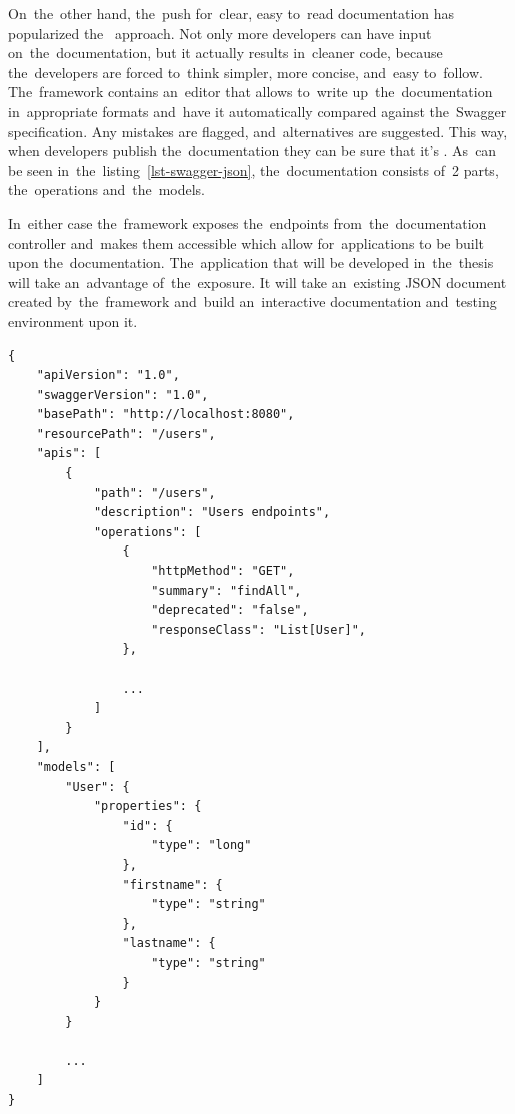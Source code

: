On~the~other hand, the~push for~clear, easy to~read documentation has
popularized the~ approach. Not only more developers can have
input on~the~documentation, but it actually results in~cleaner code, because
the~developers are forced to~think simpler, more concise, and~easy to~follow.
The~framework contains an~editor that allows to~write up~the~documentation
in~appropriate formats and~have it automatically compared against the~Swagger
specification. Any mistakes are flagged, and~alternatives are suggested. This
way, when developers publish the~documentation they can be sure that it's
. As~can be seen in~the~listing~\ref{lst-swagger-json},
the~documentation consists of~2 parts, the~operations and~the~models.

In~either case the~framework exposes the~endpoints from~the~documentation
controller and~makes them accessible which allow for~applications to be built
upon the~documentation. The~application that will be developed in~the~thesis
will take an~advantage of~the~exposure. It will take an~existing JSON document
created by~the~framework and~build an~interactive documentation and~testing
environment upon it.

\vspace{1mm}
\begin{lstlisting}[caption=An~example of~API documentation in~JSON format
created using the~Swagger framework., style=dp-default, label=lst-swagger-json]
{
	"apiVersion": "1.0",
	"swaggerVersion": "1.0",
	"basePath": "http://localhost:8080",
	"resourcePath": "/users",
	"apis": [
		{
			"path": "/users",
			"description": "Users endpoints",
			"operations": [
				{
					"httpMethod": "GET",
					"summary": "findAll",
					"deprecated": "false",
					"responseClass": "List[User]", 
				},
				
				... 
			]
		}
	],
	"models": [
		"User": {
			"properties": {
				"id": {
					"type": "long"
				},
				"firstname": {
					"type": "string"
				},
				"lastname": {
					"type": "string"
				}
			}
		}
		
		...	
	]
}
\end{lstlisting}
  





